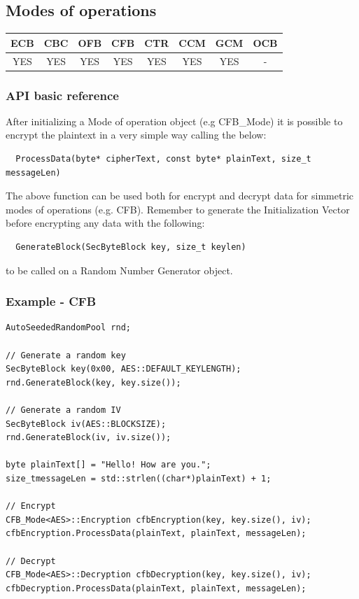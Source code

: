 \subsection{Modes of operations}
\begin{table}[!h]
	\begin{tabular}{|| c | c | c | c | c | c | c | c ||}
		\textbf{ECB} & \textbf{CBC} & \textbf{OFB} & \textbf{CFB} & \textbf{CTR} & \textbf{CCM} & \textbf{GCM} & \textbf{OCB} \\
		\hline \hline
		YES & YES & YES & YES & YES  & YES & YES & - \\
	\end{tabular}
\end{table}

\subsubsection*{API basic reference}
After initializing a Mode of operation object (e.g CFB\_Mode) it is possible to encrypt the plaintext in a very simple way calling the below:
\begin{verbatim}
  ProcessData(byte* cipherText, const byte* plainText, size_t messageLen)
\end{verbatim}
The above function can be used both for encrypt and decrypt data for simmetric modes of operations (e.g. CFB). Remember to generate the Initialization Vector before encrypting any data with the following:
\begin{verbatim}
  GenerateBlock(SecByteBlock key, size_t keylen)
\end{verbatim}
to be called on a Random Number Generator object.
\subsubsection*{Example - CFB}
\begin{verbatim}
AutoSeededRandomPool rnd;

// Generate a random key
SecByteBlock key(0x00, AES::DEFAULT_KEYLENGTH);
rnd.GenerateBlock(key, key.size());

// Generate a random IV
SecByteBlock iv(AES::BLOCKSIZE);
rnd.GenerateBlock(iv, iv.size());

byte plainText[] = "Hello! How are you.";
size_tmessageLen = std::strlen((char*)plainText) + 1;

// Encrypt
CFB_Mode<AES>::Encryption cfbEncryption(key, key.size(), iv);
cfbEncryption.ProcessData(plainText, plainText, messageLen);

// Decrypt
CFB_Mode<AES>::Decryption cfbDecryption(key, key.size(), iv);
cfbDecryption.ProcessData(plainText, plainText, messageLen);

\end{verbatim}
